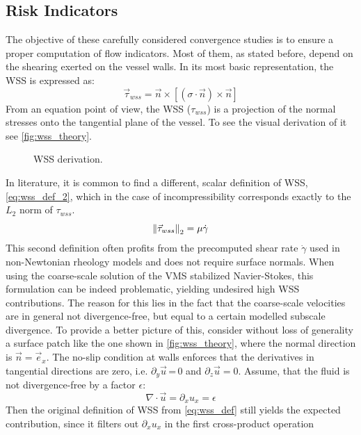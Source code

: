 \subsection{Risk Indicators}
The objective of these carefully considered convergence studies is to ensure a proper computation of flow indicators. Most of them, as stated before, depend on the shearing exerted on the vessel walls. In its most basic representation, the WSS is expressed as:
\begin{equation}
	\vec{\tau}_{wss}  = \vec{n} \times \left[ (\sigma\cdot\vec{n})\times \vec{n}\right]
	\label{eq:wss_def}
\end{equation}
From an equation point of view, the WSS ($\tau_{wss}$) is a projection of the normal stresses onto the tangential plane of the vessel. To see the visual derivation of it see \autoref{fig:wss_theory}.
\begin{figure}[ht]
	\centering
	
	\caption[Derivation of WSS]{WSS derivation.}\label{fig:wss_theory}
\end{figure}
In literature, it is common to find a different, scalar definition of WSS, \autoref{eq:wss_def_2}, which in the case of incompressibility corresponds exactly to the $L_2$ norm of $\tau_{wss}$.
\begin{equation}
	\left\lVert\vec{\tau}_{wss}\right\rVert_2 = \mu\dot{\gamma}
	\label{eq:wss_def_2}
\end{equation}
This second definition often profits from the precomputed shear rate $\dot{\gamma}$ used in non-Newtonian rheology models and does not require surface normals. When using the coarse-scale solution of the VMS stabilized Navier-Stokes, this formulation can be indeed problematic, yielding undesired high WSS contributions. The reason for this lies in the fact that the coarse-scale velocities are in general not divergence-free, but equal to a certain modelled subscale divergence. To provide a better picture of this, consider without loss of generality a surface patch like the one shown in \autoref{fig:wss_theory}, where the normal direction is $\vec{n}=\vec{e}_x$. The no-slip condition at walls enforces that the derivatives in tangential directions are zero, i.e. $\partial_y\vec{u}$\,=\,0 and $\partial_z\vec{u}=0$. Assume, that the fluid is not divergence-free by a factor $\epsilon$:
\begin{equation*}
	\nabla \cdot \vec{u} = \partial_x u_x = \epsilon
\end{equation*}
Then the original definition of WSS from \autoref{eq:wss_def} still yields the expected contribution, since it filters out $\partial_x u_x$ in the first cross-product operation
